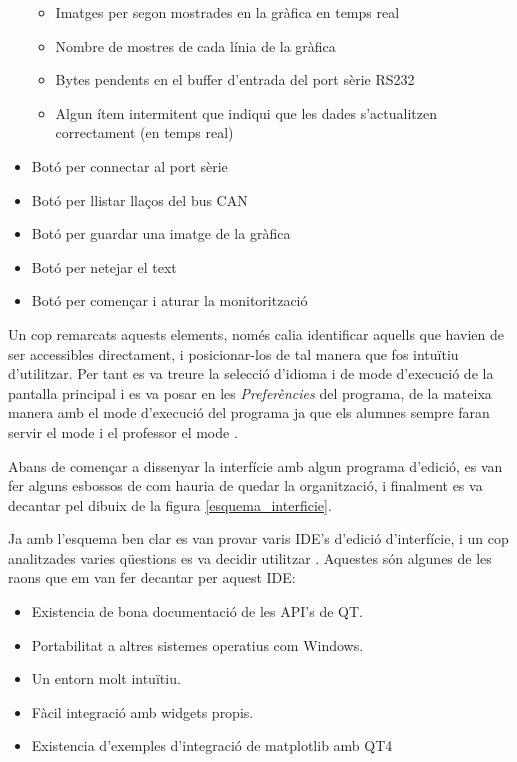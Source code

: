 \begin{itemize}
\begin{itemize}
			\item Imatges per segon mostrades en la gràfica en temps real
			\item Nombre de mostres de cada línia de la gràfica
			\item Bytes pendents en el buffer d'entrada del port sèrie RS232
			\item Algun ítem intermitent que indiqui que les dades s'actualitzen correctament (en temps real)
		\end{itemize}
	\item Botó per connectar al port sèrie
	\item Botó per llistar llaços del bus CAN
	\item Botó per guardar una imatge de la gràfica
	\item Botó per netejar el text
	\item Botó per començar i aturar la monitorització
\end{itemize}

Un cop remarcats aquests elements, només calia identificar aquells que havien de ser accessibles directament, i posicionar-los de tal manera que fos intuïtiu d'utilitzar. Per tant es va treure la selecció d'idioma i de mode d'execució de la pantalla principal i es va posar en les \emph{Preferències} del programa, de la mateixa manera amb el mode d'execució del programa ja que els alumnes sempre faran servir el mode \SensorActuador i el professor el mode \Monitor.

Abans de començar a dissenyar la interfície amb algun programa d'edició, es van fer alguns esbossos de com hauria de quedar la organització, i finalment es va decantar pel dibuix de la figura \ref{esquema_interficie}.

\begin{landscape}
\end{landscape}

Ja amb l'esquema ben clar es van provar varis IDE's d'edició d'interfície, i un cop analitzades varies qüestions es va decidir utilitzar \QTCreator. Aquestes són algunes de les raons que em van fer decantar per aquest IDE:

\begin{itemize}
	\item Existencia de bona documentació de les API's de QT.
	\item Portabilitat a altres sistemes operatius com Windows.
	\item Un entorn molt intuïtiu.
	\item Fàcil integració amb widgets propis.
	\item Existencia d'exemples d'integració de matplotlib amb QT4 \cite[Capítol 6 del llibre \emph{Matplotlib for Python Developers}]{EmbedMatQT4}
\end{itemize}

